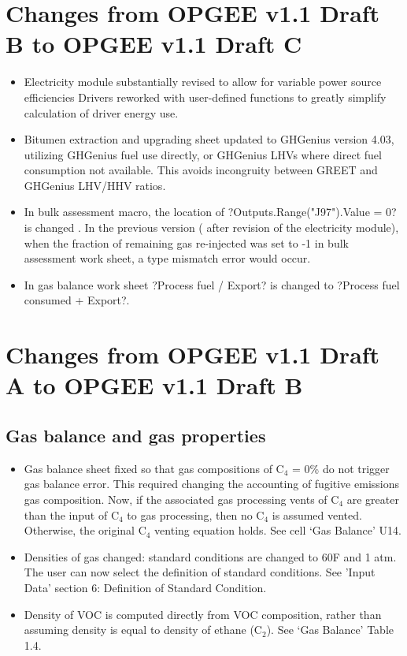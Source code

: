 \documentclass[11pt]{report}
\begin{document}
\section{Changes from OPGEE v1.1 Draft B to OPGEE v1.1 Draft C}
\begin{itemize}
\item Electricity module substantially revised to allow for variable power source efficiencies
Drivers reworked with user-defined functions to greatly simplify calculation of driver energy use.
\item Bitumen extraction and upgrading sheet updated to GHGenius version 4.03, utilizing GHGenius fuel use directly, or GHGenius LHVs where direct fuel consumption not available. This avoids incongruity between GREET and GHGenius LHV/HHV ratios.
\item In bulk assessment macro, the location of ?Outputs.Range("J97").Value = 0? is changed . In the previous version ( after revision of the electricity module), when the fraction of remaining gas re-injected was set to -1 in bulk assessment work sheet, a type mismatch error would occur.
\item In gas balance work sheet ?Process fuel / Export? is changed to ?Process fuel consumed + Export?.
\end{itemize}




\section{Changes from OPGEE v1.1 Draft A to OPGEE v1.1 Draft B}

\subsection{Gas balance and gas properties} 

\begin{itemize}
\item Gas balance sheet fixed so that gas compositions of C$_4$ = 0\% do not trigger gas balance error. This required changing the accounting of fugitive emissions gas composition. Now, if the associated gas processing vents of C$_4$ are greater than the input of C$_4$ to gas processing, then no C$_4$ is assumed vented. Otherwise, the original C$_4$ venting equation holds. See cell `Gas Balance' U14. 
\item Densities of gas changed: standard conditions are changed to 60F and 1 atm. The user can now select the definition of standard conditions. See 'Input Data' section 6: Definition of Standard Condition. 
\item Density of VOC is computed directly from VOC composition, rather than assuming density is equal to density of ethane (C$_2$). See `Gas Balance' Table 1.4.
\end{itemize}
\end{document}
